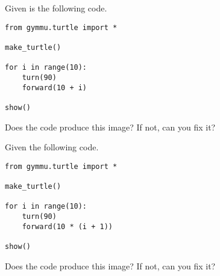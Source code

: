 \documentclass[11pt,a4paper]{report}
\begin{document}
\begin{ex}
Given is the following code.
\begin{lstlisting}
from gymmu.turtle import *

make_turtle()

for i in range(10):
    turn(90)
    forward(10 + i)

show()
\end{lstlisting}
Does the code produce this image? If not, can you fix it?
\end{ex}


\begin{ex}
Given  the following code.
\begin{lstlisting}
from gymmu.turtle import *

make_turtle()

for i in range(10):
    turn(90)
    forward(10 * (i + 1))

show()
\end{lstlisting}
Does the code produce this image? If not, can you fix it?
\end{ex}
\end{document}
